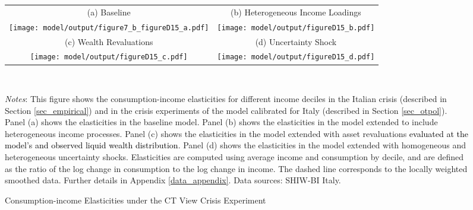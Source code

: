 \documentclass[12pt]{article}
\begin{document}
\begin{spacing}{1.5}
\begin{figure}[htbp]
\caption{Consumption-income Elasticities under the CT View Crisis Experiment}
\label{fig:ff_cie}
\begin{tabular}{cc}
(a) Baseline & (b) Heterogeneous Income Loadings \\
 \texttt{[image: model/output/figure7\_b\_figureD15\_a.pdf]} &
 \texttt{[image: model/output/figureD15\_b.pdf]} \\
(c) Wealth Revaluations & (d) Uncertainty Shock \\
 \texttt{[image: model/output/figureD15\_c.pdf]} &
 \texttt{[image: model/output/figureD15\_d.pdf]} 
\end{tabular} \smallskip \\
\raggedright{}\textit{\footnotesize{}Notes}{: \footnotesize{This figure shows the consumption-income elasticities for different income deciles in the Italian crisis (described in Section \ref{sec_empirical}) and in the crisis experiments of the model calibrated for Italy (described in Section \ref{sec_otpol}). Panel (a) shows  the elasticities in the baseline model.  Panel (b) shows the elasticities in the model extended to include heterogeneous income processes.  Panel (c) shows the elasticities in the model extended with asset revaluations \textcolor{black}{evaluated at the model's and observed liquid wealth distribution}.  Panel (d) shows the elasticities in the model extended with homogeneous and heterogeneous uncertainty shocks.  Elasticities are computed using average income and consumption by decile, and are defined as the ratio of the log change in consumption to the log change in income. The dashed line corresponds to the locally weighted smoothed data. Further details in Appendix \ref{data_appendix}.
Data sources: SHIW-BI Italy.
}}{\footnotesize\par}
\end{figure}


\end{spacing}
\end{document}
